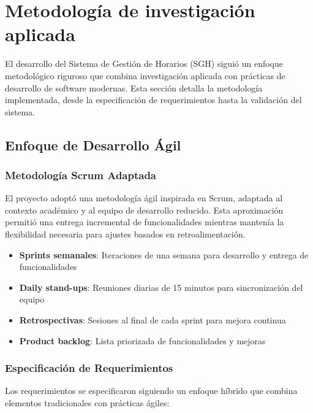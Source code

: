 \section{Metodología de investigación aplicada}

El desarrollo del Sistema de Gestión de Horarios (SGH) siguió un enfoque metodológico riguroso que combina investigación aplicada con prácticas de desarrollo de software modernas. Esta sección detalla la metodología implementada, desde la especificación de requerimientos hasta la validación del sistema.

\subsection{Enfoque de Desarrollo Ágil}

\subsubsection{Metodología Scrum Adaptada}

El proyecto adoptó una metodología ágil inspirada en Scrum, adaptada al contexto académico y al equipo de desarrollo reducido. Esta aproximación permitió una entrega incremental de funcionalidades mientras mantenía la flexibilidad necesaria para ajustes basados en retroalimentación.

\begin{itemize}
\item \textbf{Sprints semanales}: Iteraciones de una semana para desarrollo y entrega de funcionalidades
\item \textbf{Daily stand-ups}: Reuniones diarias de 15 minutos para sincronización del equipo
\item \textbf{Retrospectivas}: Sesiones al final de cada sprint para mejora continua
\item \textbf{Product backlog}: Lista priorizada de funcionalidades y mejoras
\end{itemize}

\subsubsection{Especificación de Requerimientos}

Los requerimientos se especificaron siguiendo un enfoque híbrido que combina elementos tradicionales con prácticas ágiles:

